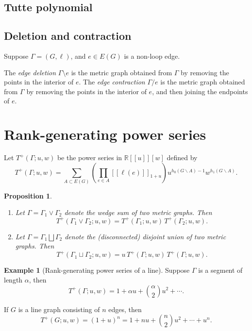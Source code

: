 \documentclass{amsart}
\newtheorem{prop}[thm]{Proposition}
\theoremstyle{definition}
\newtheorem{eg}[thm]{Example}
\newcommand{\RR}{\mathbb{R}}
\newcommand{\fanalog}[2]{[\![#2]\!]_{#1}}
\begin{document}
\subsection{Tutte polynomial}

\subsection{Deletion and contraction}

Suppose $\Gamma = (G,\ell)$, and $e \in E(G)$ is a non-loop edge.

The {\em edge deletion} $\Gamma \setminus e$ is the metric graph obtained from $\Gamma$ by removing the points in the interior of $e$.
The {\em edge contraction} $\Gamma / e$ is the metric graph obtained from $\Gamma$ by removing the points in the interior of $e$, and then joining the endpoints of $e$.


\section{Rank-generating power series}

Let $T^+(\Gamma; u,w)$ be the power series in $\RR[\![u]\!][w]$
defined by
\begin{equation}
	T^+(\Gamma; u,w) = \sum_{A \subset E(G)} \left( \prod_{e \in A} \fanalog{1 + u}{\ell(e)} \right)
	u^{h_0(G\backslash A) - 1}w^{h_1(G\backslash A)} .
\end{equation}


\begin{prop}
\hfill
\begin{enumerate}
\item 
Let $\Gamma = \Gamma_1 \vee \Gamma_2$ denote the wedge sum of two metric graphs. Then
\[
	T^+(\Gamma_1 \vee \Gamma_2; u,w) = T^+(\Gamma_1; u,w) \, T^+(\Gamma_2; u, w).
\]

\item 
Let $\Gamma = \Gamma_1 \bigsqcup \Gamma_2$ denote the (disconnected) disjoint union of two metric graphs. Then
\[
	T^+(\Gamma_1 \sqcup \Gamma_2; u,w) = u\, T^+(\Gamma; u,w) \, T^+(\Gamma; u, w).
\]

\end{enumerate}
\end{prop}

\begin{eg}[Rank-generating power series of a line]
Suppose $\Gamma$ is a segment of length $\alpha$,
then
\[
	T^+(\Gamma;u,w) 
= 1 + \alpha u + \binom{\alpha}{2}u^2 + \cdots .
\]

If $G$ is a line graph consisting of $n$ edges,
then
\[
	T^+(G;u,w) = (1+u)^n = 1 + nu + \binom{n}{2}u^2 + \cdots + u^n.
\]
\end{eg}
\end{document}
